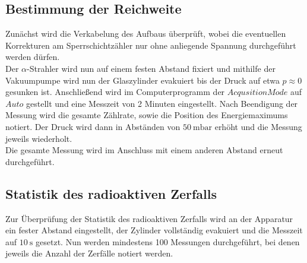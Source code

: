 \subsection{Bestimmung der Reichweite}
Zunächst wird die Verkabelung des Aufbaus überprüft, wobei die eventuellen Korrekturen
am Sperrschichtzähler nur ohne anliegende Spannung durchgeführt werden dürfen.\\
Der $\alpha$-Strahler wird nun auf einem festen Abstand fixiert und mithilfe der Vakuumpumpe
wird nun der Glaszylinder evakuiert bis der Druck auf etwa
$p \approx 0$ gesunken ist.
Anschließend wird im Computerprogramm der $Acqusition Mode$ auf $Auto$
gestellt und eine Messzeit von 2 Minuten eingestellt. Nach Beendigung der Messung wird
die gesamte Zählrate, sowie die Position des Energiemaximums notiert.
Der Druck wird dann in Abständen von $\SI{50}{\milli\bar}$ erhöht und die Messung jeweils
wiederholt.\\
Die gesamte Messung wird im Anschluss mit einem anderen Abstand erneut
durchgeführt.
\subsection{Statistik des radioaktiven Zerfalls}
Zur Überprüfung der Statistik des radioaktiven Zerfalls wird an der Apparatur ein
fester Abstand eingestellt, der Zylinder vollständig evakuiert und die Messzeit auf $\SI{10}{\second}$ gesetzt. Nun werden
mindestens 100 Messungen durchgeführt, bei denen jeweils die Anzahl der Zerfälle notiert
werden.
